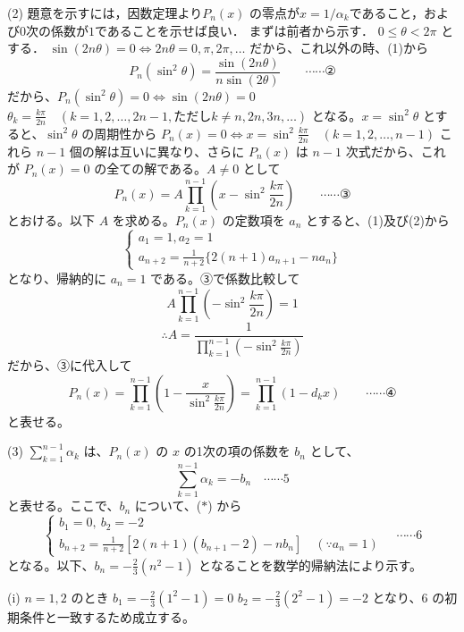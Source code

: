 \documentclass[a4paper,10pt]{ltjsarticle}
\begin{document}
\begin{multicols}{2}
\vspace{10pt}
(2) 題意を示すには，因数定理より$P_n(x)$ の零点が$x=1/\alpha_{k}$であること，および$0$次の係数が$1$であることを示せば良い．
まずは前者から示す．
$0 \le \theta < 2\pi$ とする．
$\sin(2n\theta) = 0 \Leftrightarrow 2n\theta = 0, \pi, 2\pi, \dots$
だから、これ以外の時、(1)から
$$P_n(\sin^2\theta) = \frac{\sin(2n\theta)}{n\sin(2\theta)} \qquad \cdots\cdots ②$$
だから、$P_n(\sin^2\theta)=0 \Leftrightarrow \sin(2n\theta)=0$
$\theta_k = \frac{k\pi}{2n} \quad (k=1, 2, \dots, 2n-1, \text{ただし} k \ne n, 2n, 3n, \dots)$ となる。$x=\sin^2\theta$ とすると、$\sin^2\theta$ の周期性から
$P_n(x)=0 \Leftrightarrow x = \sin^2\frac{k\pi}{2n} \quad (k=1, 2, \dots, n-1)$
これら $n-1$ 個の解は互いに異なり、さらに $P_n(x)$ は $n-1$ 次式だから、これが $P_n(x)=0$ の全ての解である。$A\ne 0$ として
$$P_n(x) = A \prod_{k=1}^{n-1} \left(x - \sin^2\frac{k\pi}{2n}\right) \qquad \cdots\cdots ③$$
とおける。以下 $A$ を求める。$P_n(x)$ の定数項を $a_n$ とすると、(1)及び(2)から
$$\begin{cases} a_1=1, a_2=1 \\ a_{n+2} = \frac{1}{n+2}\{2(n+1)a_{n+1} - na_n\} \end{cases}$$
となり、帰納的に $a_n=1$ である。③で係数比較して
$$A \prod_{k=1}^{n-1} \left(-\sin^2\frac{k\pi}{2n}\right) = 1$$
$$\therefore A = \frac{1}{\prod_{k=1}^{n-1} \left(-\sin^2\frac{k\pi}{2n}\right)}$$
だから、③に代入して
$$P_n(x) = \prod_{k=1}^{n-1} \left(1 - \frac{x}{\sin^2\frac{k\pi}{2n}}\right) = \prod_{k=1}^{n-1} (1-d_k x) \qquad \cdots\cdots ④$$
と表せる。

(3)
$\sum_{k=1}^{n-1} \alpha_k$ は、$P_n(x)$ の $x$ の1次の項の係数を $b_n$ として、
$$
\sum_{k=1}^{n-1} \alpha_k = -b_n \quad \cdots\cdots {5}
$$
と表せる。ここで、$b_n$ について、($*$) から
$$
\begin{cases}
b_1 = 0, \ b_2 = -2 \\
b_{n+2} = \frac{1}{n+2} [2(n+1)(b_{n+1} - 2) - n b_n] \quad (\because a_n=1)
\end{cases}
\quad \cdots\cdots {6}
$$
となる。以下、$b_n = -\frac{2}{3}(n^2 - 1)$ となることを数学的帰納法により示す。

\vspace{10pt}

(i) $n=1, 2$ のとき
$b_1 = -\frac{2}{3}(1^2-1) = 0$
$b_2 = -\frac{2}{3}(2^2-1) = -2$
となり、${6}$ の初期条件と一致するため成立する。

\vspace{10pt}


\end{multicols}
\end{document}
